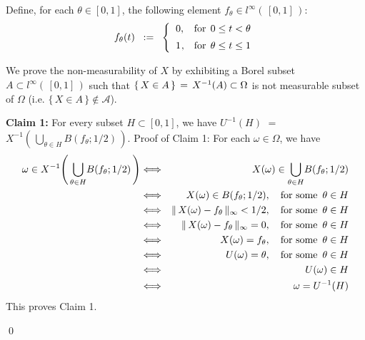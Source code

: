\proof
Define, for each $\theta \in [0,1]$, the following element $f_{\theta} \in l^{\infty}(\,[0,1]\,)$:
\begin{equation*}
f_{\theta}(t)
\;\; := \;\;
	\left\{\begin{array}{cc}
	0, & \textnormal{for} \;\, 0 \leq t < \theta
	\\
	\overset{{\color{white}+}}{1}, & \textnormal{for} \;\, \theta \leq t \leq 1
	\end{array}\right.
\end{equation*}

We prove the non-measurability of $X$ by exhibiting a Borel subset $A \subset l^{\infty}(\,[0,1]\,)$
such that $\{\,X \in A\,\} \,=\, X^{-1}(\overset{{\color{white}.}}{A}) \subset \Omega$ is not measurable
subset of $\Omega$ (i.e. $\{\,X \in A\,\} \notin \mathcal{A}$).

\vskip 0.5cm
\noindent
\textbf{Claim 1:}\;\;
For every subset $H \subset [0,1]$, we have
$U^{-1}(H)$ $=$ $X^{-1}\!\left(\,\underset{\theta\in H}{\bigcup}B(f_{\theta};1/2)\,\right)$.
\vskip 0.3cm
\noindent
Proof of Claim 1:\quad
For each $\omega \in \Omega$, we have
\begin{eqnarray*}
\omega \in X^{-1}\!\left(\,\underset{\theta\in H}{\bigcup}B(f_{\theta};1/2)\,\right)
&\Longleftrightarrow&
	X(\omega) \in \underset{\theta\in H}{\bigcup}B(f_{\theta};1/2)
\\
&\Longleftrightarrow&
	X(\omega) \in B(f_{\theta};1/2),
	\quad
	\textnormal{for some \,$\theta \in H$}
\\
&\Longleftrightarrow&
	\Vert\, X(\omega) - f_{\theta}\,\Vert_{\infty} < 1/2,
	\quad
	\textnormal{for some \,$\theta \in H$}
\\
&\Longleftrightarrow&
	\Vert\, X(\omega) - f_{\theta}\,\Vert_{\infty} = 0,
	\quad
	\textnormal{for some \,$\theta \in H$}
\\
&\Longleftrightarrow&
	X(\omega) = f_{\theta},
	\quad
	\textnormal{for some \,$\theta \in H$}
\\
&\Longleftrightarrow&
	U(\omega) = \theta,
	\quad
	\textnormal{for some \,$\theta \in H$}
\\
&\Longleftrightarrow&
	U(\omega) \in H
\\
&\Longleftrightarrow&
	\omega = U^{-1}(H)
\end{eqnarray*}
This proves Claim 1.

\qed



\renewcommand{\theenumi}{\roman{enumi}}
\renewcommand{\labelenumi}{\textnormal{(\theenumi)}$\;\;$}

